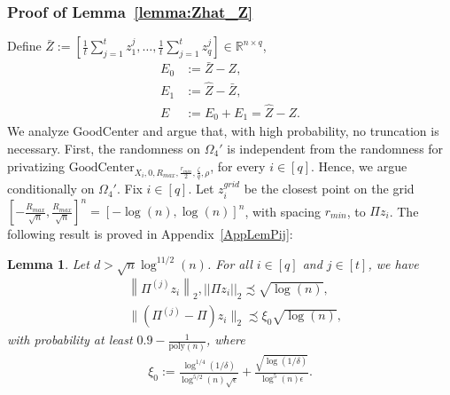 \documentclass{article}
\newtheorem{lemma}{Lemma}
\begin{document}

\subsubsection{Proof of Lemma~\ref{lemma:Zhat_Z}}
\label{AppLemZhat}

Define $\bar{Z} := \left[\frac{1}{t}\sum_{j = 1}^tz_1^j, \dots, \frac{1}{t}\sum_{j = 1}^tz_q^j\right] \in \mathbb{R}^{n \times q}$,
\begin{align*}
E_0 & := \bar{Z} - Z, \\
%
E_1 & := \hat{Z} - \bar{Z}, \\
%
E & := E_0 + E_1 = \hat{Z} - Z.
\end{align*}
We analyze GoodCenter and argue that, with high probability, no truncation is necessary. First, the randomness on $\Omega_4'$ is independent from the randomness for privatizing $\mathrm{GoodCenter}_{X_i, 0, R_{max}, \frac{r_{min}}{2}, \frac{\zeta}{q}, \rho}$, for every $i \in [q]$. Hence, we argue conditionally on $\Omega_4'$. Fix $i \in [q]$. Let $z_i^{grid}$ be the closest point on the grid $\left[-\frac{R_{max}}{\sqrt{n}}, \frac{R_{max}}{\sqrt{n}}\right]^n = \left[-\log(n), \log(n)\right]^n$, with spacing $r_{min}$, to $\Pi z_i$. The following result is proved in Appendix~\ref{AppLemPij}:

\begin{lemma}
\label{lemma:Pi^j-Pi}
Let $d > \sqrt{n}\log^{11/2}(n)$. For all $i \in [q]$ and $j \in [t]$, we have
\begin{align*}
&\left\|\Pi^{(j)}z_i\right\|_2, ||\Pi z_i||_2 \precsim \sqrt{\log(n)},\\
&\|(\Pi^{(j)} - \Pi)z_i\|_2 \precsim \xi_0\sqrt{\log(n)},
\end{align*}
with probability at least $0.9 - \frac{1}{\mathrm{poly}(n)}$, where 
\begin{align*}
\xi_0 := \frac{\log^{1/4}(1/\delta)}{\log^{5/2}(n)\sqrt{\epsilon}} + \frac{\sqrt{\log(1/\delta)}}{\log^5(n)\epsilon}.
\end{align*}
\end{lemma}
\end{document}
